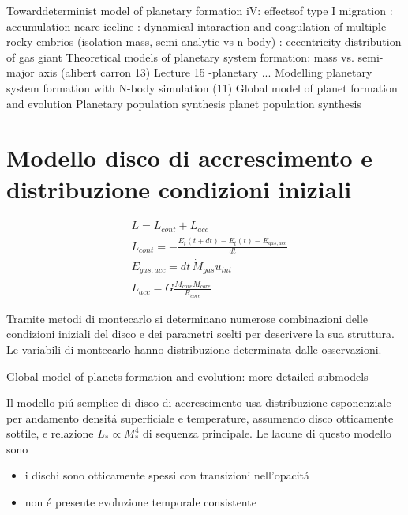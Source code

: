 \begin{workout}
Towarddeterminist model of planetary formation iV: effectsof type I migration
									: accumulation neare iceline
									: dynamical intaraction and coagulation of multiple rocky embrios (isolation mass, semi-analytic vs n-body)
									: eccentricity distribution of gas giant
Theoretical models of planetary system formation: mass vs. semi-major axis	(alibert carron 13)			Lecture 15 -planetary ...
Modelling planetary system formation with N-body simulation (11)
Global model of planet formation and evolution
Planetary population synthesis
planet population synthesis					
\end{workout}

\section{Modello disco di accrescimento e distribuzione condizioni iniziali}



\begin{workout}
\begin{align}
&L=L_{cont}+L_{acc}\\
&L_{cont}=-\frac{E_t(t+dt)-E_t(t)-E_{gas,acc}}{dt}\\
&E_{gas,acc}=dt\,\dot{M}_{gas}u_{int}\\
&L_{acc}=G\frac{\dot{M}_{core}M_{core}}{R_{core}}
\end{align}
\end{workout}


Tramite metodi di montecarlo si determinano numerose combinazioni delle condizioni iniziali del disco e dei parametri scelti per descrivere la sua struttura.
Le variabili di montecarlo hanno distribuzione determinata dalle osservazioni.

\begin{workout}
Global model of planets formation and evolution: more detailed submodels
\end{workout}

Il modello pi\'u semplice di disco di accrescimento usa distribuzione esponenziale per andamento densit\'a superficiale e temperature, assumendo disco otticamente sottile, e relazione $L_*\propto M_*^4$ di sequenza principale. Le lacune di questo modello sono
\begin{itemize}
\item i dischi sono otticamente spessi con transizioni nell'opacit\'a
\item non \'e presente evoluzione temporale consistente
\end{itemize}

